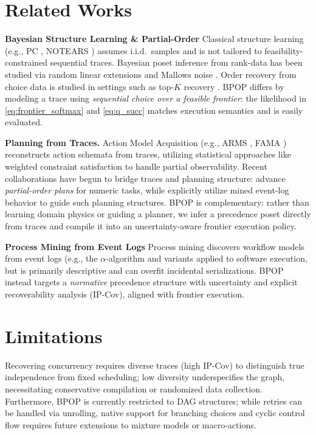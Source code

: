 \documentclass{article}
\theoremstyle{plain}
\theoremstyle{definition}
\theoremstyle{remark}
\begin{document}
\section{Related Works}
\noindent \textbf{Bayesian Structure Learning \& Partial-Order}
Classical structure learning (e.g., PC \citep{Spirtes2000causation}, NOTEARS \citep{Zheng2018dags}) assumes i.i.d.\ samples and is not tailored
to feasibility-constrained sequential traces.
Bayesian poset inference from rank-data has been studied via random linear extensions \citep{nicholls2024bayesianinferencepartialorders} and
Mallows noise \citep{chuxuan2024nonparametricbayesianinferencepartial}. Order recovery from choice data is studied in settings
such as top-$K$ recovery \citep{nguyen2022efficientaccuratetopkrecovery}.
BPOP differs by modeling a trace using \emph{sequential choice over a feasible frontier}: the likelihood in \eqref{eq:frontier_softmax} and \eqref{eq:q_succ} matches execution semantics and is easily evaluated.

\noindent \textbf{Planning from Traces.}
Action Model Acquisition (e.g., ARMS \citep{yang2007learning}, FAMA \citep{AINETO2019104}) reconstructs action schemata from traces, utilizing statistical approaches like weighted constraint satisfaction to handle partial observability.
Recent collaborations have begun to bridge traces and planning structure: \citet{HelalLakemeyer2023MVPOP} advance \emph{partial-order plans} for numeric tasks, while \citet{Park2024Incorporating} explicitly utilize mined event-log behavior to guide such planning structures.
BPOP is complementary: rather than learning domain physics or guiding a planner, we infer a precedence poset directly from traces and compile it into an uncertainty-aware frontier execution policy.

\noindent \textbf{Process Mining from Event Logs}
Process mining discovers workflow models from event logs (e.g., the $\alpha$-algorithm \citep{VanderAalst2004workflow} and variants applied to software
execution, but is primarily descriptive and can overfit incidental serializations.
BPOP instead targets a \emph{normative} precedence structure with uncertainty and explicit recoverability analysis (IP-Cov), aligned with frontier execution.


\section{Limitations}
\label{sec:limitations}
Recovering concurrency requires diverse traces (high IP-Cov) to distinguish true independence from fixed scheduling; low diversity underspecifies the graph, necessitating conservative compilation or randomized data collection. Furthermore, BPOP is currently restricted to DAG structures; while retries can be handled via unrolling, native support for branching choices and cyclic control flow requires future extensions to mixture models or macro-actions.
\end{document}
